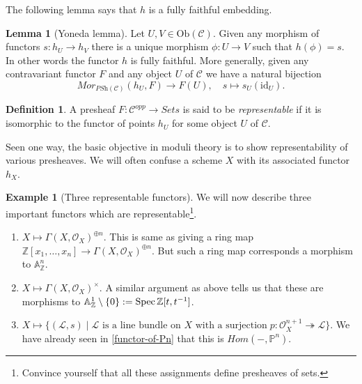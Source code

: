 \documentclass[11pt]{amsart}
\newcommand{\Spec}{{\rm Spec \,}}
\newcommand{\sL}{{\mathcal L}}
\newcommand{\sO}{{\mathcal O}}
\newcommand{\A}{{\mathbb A}}
\renewcommand{\P}{{\mathbb P}}
\newcommand{\Z}{{\mathbb Z}}
\newcommand{\Ob}{\text{Ob}}
\theoremstyle{definition}
\newtheorem{lemma}[theorem]{Lemma}
\newtheorem{definition}[theorem]{Definition}
\newtheorem{example}[theorem]{Example}
\begin{document}
The following lemma says that $h$ is a fully faithful embedding.

\begin{lemma}[Yoneda lemma]
	\label{lemma-yoneda}
	Let $U, V \in \Ob(\mathcal{C})$.
	Given any morphism of functors $s : h_U \to h_V$
	there is a unique morphism $\phi : U \to V$
	such that $h(\phi) = s$. In other words the
	functor $h$ is fully faithful. More generally,
	given any contravariant functor $F$ and any object
	$U$ of $\mathcal{C}$ we have a natural bijection
	$$
	\mathit{Mor}_{\textit{PSh}(\mathcal{C})}(h_U, F) \longrightarrow F(U),
	\quad
	s \longmapsto s_U(\text{id}_U).
	$$
\end{lemma}

\begin{definition}
	\label{definition-representable-functor}
	A presheaf $F : \mathcal{C}^{opp}\to \textit{Sets}$ is said
	to be {\it representable} if it is isomorphic to the functor of
	points $h_U$ for some object $U$ of $\mathcal{C}$.
\end{definition}

Seen one way, the basic objective in moduli theory is to show representability of various presheaves. We will often confuse a scheme $X$ with its associated functor $h_X$.

\begin{example}[Three representable functors] We will now describe three important functors which are representable\footnote{Convince yourself that all these assignments define presheaves of sets.}.
	\begin{enumerate}
		\item $X \mapsto \Gamma (X,\sO_X)^{\oplus n}$. This is same as giving a ring map $\Z[x_1,\ldots,x_n]\rightarrow \Gamma (X,\sO_X)^{\oplus n}$. But such a ring map corresponds a morphism to $\A_{\Z}^n$.
		\item $X \mapsto \Gamma (X,\sO_X)^{\times}$. A similar argument as above tells us that these are morphisms to $\A_{\Z}^1\setminus \{0\}:= \Spec \Z[t,t^{-1}]$.
		\item $X \mapsto \{ (\sL,s)\;|\; \text{$\sL$ is a line bundle on $X$ with a surjection}\; p:\sO_X^{n+1}\twoheadrightarrow \sL\}$. We have already seen in \ref{functor-of-Pn} that this is $\mathit{Hom}(-,\P^n)$.
	\end{enumerate}
\end{example}
\end{document}
